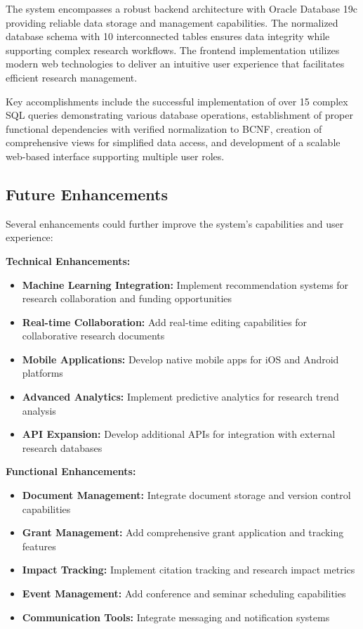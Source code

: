 \documentclass[12pt,a4paper]{article}
\begin{document}
The system encompasses a robust backend architecture with Oracle Database 19c providing reliable data storage and management capabilities. The normalized database schema with 10 interconnected tables ensures data integrity while supporting complex research workflows. The frontend implementation utilizes modern web technologies to deliver an intuitive user experience that facilitates efficient research management.

Key accomplishments include the successful implementation of over 15 complex SQL queries demonstrating various database operations, establishment of proper functional dependencies with verified normalization to BCNF, creation of comprehensive views for simplified data access, and development of a scalable web-based interface supporting multiple user roles.

\subsection{Future Enhancements}
Several enhancements could further improve the system's capabilities and user experience:

\textbf{Technical Enhancements:}
\begin{itemize}
    \item \textbf{Machine Learning Integration:} Implement recommendation systems for research collaboration and funding opportunities
    \item \textbf{Real-time Collaboration:} Add real-time editing capabilities for collaborative research documents
    \item \textbf{Mobile Applications:} Develop native mobile apps for iOS and Android platforms
    \item \textbf{Advanced Analytics:} Implement predictive analytics for research trend analysis
    \item \textbf{API Expansion:} Develop additional APIs for integration with external research databases
\end{itemize}

\textbf{Functional Enhancements:}
\begin{itemize}
    \item \textbf{Document Management:} Integrate document storage and version control capabilities
    \item \textbf{Grant Management:} Add comprehensive grant application and tracking features
    \item \textbf{Impact Tracking:} Implement citation tracking and research impact metrics
    \item \textbf{Event Management:} Add conference and seminar scheduling capabilities
    \item \textbf{Communication Tools:} Integrate messaging and notification systems
\end{itemize}
\end{document}

